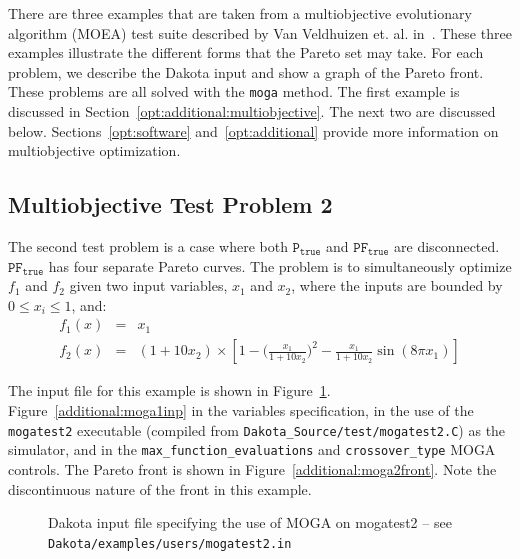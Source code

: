 There are three examples that are taken from a multiobjective 
evolutionary algorithm (MOEA) test suite described by Van Veldhuizen
et. al. in~\cite{Coe02}. These three examples 
illustrate the different forms that the Pareto set may take. For each
problem, we describe the Dakota input and show a graph of the Pareto
front. These problems are all solved with the \texttt{moga} method.
The first example is discussed in Section~\ref{opt:additional:multiobjective}. 
The next two are discussed below. 
Sections~\ref{opt:software} and~\ref{opt:additional} provide more
information on multiobjective optimization.

\subsection{Multiobjective Test Problem 2}\label{additional:multiobjective:problem2}

The second test problem is a case where both $\mathtt{P_{true}}$ and
$\mathtt{PF_{true}}$ are disconnected. $\mathtt{PF_{true}}$ has four
separate Pareto curves. The problem is to simultaneously optimize
$f_1$ and $f_2$ given two input variables, $x_1$ and $x_2$,
where the inputs are bounded by $0 \leq x_{i} \leq 1$, and:
\begin{eqnarray*}
f_1(x) &=& x_1 \\
f_2(x) &=& (1+10x_2) \times \left[1-\bigg(\frac{x_1}{1+10x_2}\bigg)^2-
\frac{x_1}{1+10x_2}\sin(8\pi x_1)\right]
\end{eqnarray*}

The input file for this example is shown in
Figure~\ref{additional:moga2inp}.
Figure~\ref{additional:moga1inp} in the variables specification, in
the use of the \texttt{mogatest2} executable (compiled from
\texttt{Dakota\_Source/test/mogatest2.C}) as the simulator, and in the
\texttt{max\_function\_evaluations} and \texttt{crossover\_type} MOGA
controls. The Pareto front is shown in
Figure~\ref{additional:moga2front}. Note the discontinuous nature of
the front in this example.

\begin{figure}
  \centering
  \begin{bigbox}
    \begin{small}
    \end{small}
  \end{bigbox}
  \caption{Dakota input file specifying the use of MOGA on mogatest2 --
see \texttt{Dakota/examples/users/mogatest2.in} }
  \label{additional:moga2inp}
\end{figure}

